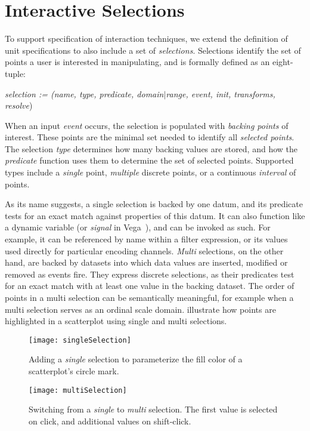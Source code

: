 \section{Interactive Selections}
\label{sec:vl:goi}

To support specification of interaction techniques, we extend the definition of
unit specifications to also include a set of \emph{selections}. Selections
identify the set of points a user is interested in manipulating, and is formally
defined as an eight-tuple:

\centerline{
  \emph{selection := (name, type, predicate, domain$|$range, event, init,
  transforms, resolve})
}

When an input \emph{event} occurs, the selection is populated with \emph{backing
points} of interest. These points are the minimal set needed to identify all
\emph{selected points}. The selection \emph{type} determines how many backing
values are stored, and how the \emph{predicate} function uses them to determine
the set of selected points. Supported types include a \emph{single} point,
\emph{multiple} discrete points, or a continuous \emph{interval} of points.

As its name suggests, a single selection is backed by one datum, and its
predicate tests for an exact match against properties of this datum. It can also
function like a dynamic variable (or \emph{signal} in
Vega~\cite{reactive-vega-model}), and can be invoked as such. For example, it
can be referenced by name within a filter expression, or its values used
directly for particular encoding channels. \emph{Multi} selections, on the other
hand, are backed by datasets into which data values are inserted, modified or
removed as events fire. They express discrete selections, as their predicates
test for an exact match with at least one value in the backing dataset. The
order of points in a multi selection can be semantically meaningful, for example
when a multi selection serves as an ordinal scale domain.
 illustrate how points are
highlighted in a scatterplot using single and multi selections.

\begin{figure*}[h!]
  \centering
  \texttt{[image: singleSelection]}
  \caption{Adding a \emph{single} selection to parameterize the fill color
  of a scatterplot's circle mark.}
  \label{fig:singleSelection}
\end{figure*}

\begin{figure*}[h!]
  \centering
  \texttt{[image: multiSelection]}
  \caption{Switching from a \emph{single} to \emph{multi} selection. The first
  value is selected on click, and additional values on shift-click.}
  \label{fig:multiSelection}
\end{figure*}

